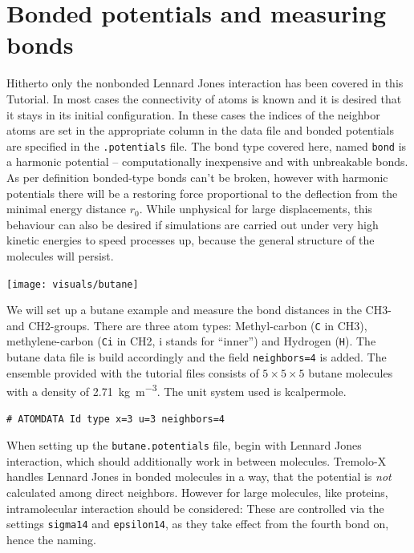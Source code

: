 \section{Bonded potentials and measuring bonds}
Hitherto only the nonbonded Lennard Jones interaction has been covered in
this Tutorial. In most cases the connectivity of atoms is known and it
is desired that it stays in its initial configuration. In these cases
the indices of the neighbor atoms are set in the appropriate column in
the data file and bonded potentials are specified in the
\texttt{.potentials} file. The bond type covered here, named
\texttt{bond} is a harmonic potential -- computationally inexpensive and
with unbreakable bonds. As
per definition bonded-type bonds can't be broken, however with harmonic
potentials there will be a restoring force proportional to the
deflection from the minimal energy distance $r_0$. While unphysical for
large displacements, this behaviour can also be desired if simulations
are carried out under very high kinetic energies to speed processes up,
because the general structure of the molecules will persist.

\begin{center}
    \texttt{[image: visuals/butane]} %
\end{center}

We will set up a butane example and measure the bond distances in the
CH3- and CH2-groups. There are three atom types: Methyl-carbon
(\texttt{C} in CH3), methylene-carbon (\texttt{Ci} in CH2, i stands for
``inner'') and Hydrogen (\texttt{H}). The butane data file is build
accordingly and the field \texttt{neighbors=4} is added. The ensemble
provided with the tutorial files consists of $5\times 5\times 5$ butane
molecules with a density of \SI{2.71}{\kilogram\per\cubic\meter}. The
unit system used is kcalpermole.

\begin{lstlisting}[caption=Header of the .data file]
# ATOMDATA Id type x=3 u=3 neighbors=4
\end{lstlisting}

When setting up the \texttt{butane.potentials} file, begin with Lennard
Jones interaction, which should additionally work in between molecules.
Tremolo-X handles Lennard Jones in bonded molecules in a way, that the
potential is \emph{not} calculated among direct neighbors. However for
large molecules, like proteins, intramolecular interaction should be
considered: These are controlled via the settings \texttt{sigma14} and
\texttt{epsilon14}, as they take effect from the fourth bond on, hence
the naming.

